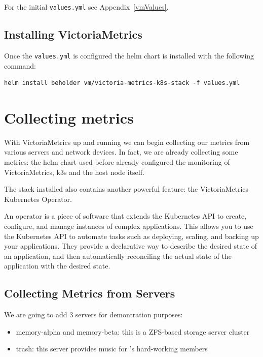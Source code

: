 For the initial \verb+values.yml+ see Appendix~\ref{vmValues}.

\subsection{Installing VictoriaMetrics}

Once the \verb+values.yml+ is configured the helm chart is installed with the
following command:

\begin{lstlisting}
helm install beholder vm/victoria-metrics-k8s-stack -f values.yml
\end{lstlisting}

\section{Collecting metrics}

With VictoriaMetrics up and running we can begin collecting our metrics from
various servers and network devices. In fact, we are already collecting some
metrics: the helm chart used before already configured the monitoring of
VictoriaMetrics, k3s and the host node itself.

The stack installed also contains another powerful feature: the VictoriaMetrics
Kubernetes Operator.

An operator is a piece of software that extends the Kubernetes API to create,
configure, and manage instances of complex applications. This allows you to use
the Kubernetes API to automate tasks such as deploying, scaling, and backing up
your applications. They provide a declarative way to describe the desired state
of an application, and then automatically reconciling the actual state of the
application with the desired state.

\subsection{Collecting Metrics from Servers}

We are going to add 3 servers for demontration purposes:
\begin{itemize}
	\item memory-alpha and memory-beta: this is a ZFS-based storage server cluster
	\item trash: this server provides music for \kszk's hard-working members
\end{itemize}

